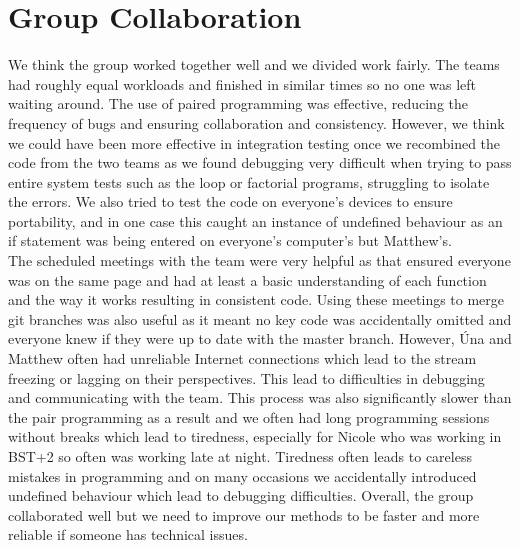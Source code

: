 \documentclass[11pt]{article}
\begin{document}
\section{Group Collaboration}
We think the group worked together well and we divided work fairly. The teams had roughly equal workloads and finished in similar times so no one was left waiting around. The use of paired programming was effective, reducing the frequency of bugs and ensuring collaboration and consistency. However, we think we could have been more effective in integration testing once we recombined the code from the two teams as we found debugging very difficult when trying to pass entire system tests such as the loop or factorial programs, struggling to isolate the errors. We also tried to test the code on everyone’s devices to ensure portability, and in one case this caught an instance of undefined behaviour as an if statement was being entered on everyone’s computer’s but Matthew’s.\\    
\newpage The scheduled meetings with the team were very helpful as that ensured everyone was on the same page and had at least a basic understanding of each function and the way it works resulting in consistent code. Using these meetings to merge git branches was also useful as it meant no key code was accidentally omitted and everyone knew if they were up to date with the master branch. However, \'Una and Matthew often had unreliable Internet connections which lead to the stream freezing or lagging on their perspectives. This lead to difficulties in debugging and communicating with the team. This process was also significantly slower than the pair programming as a result and we often had long programming sessions without breaks which lead to tiredness, especially for Nicole who was working in BST+2 so often was working late at night. Tiredness often leads to careless mistakes in programming and on many occasions we accidentally introduced undefined behaviour which lead to debugging difficulties. Overall, the group collaborated well but we need to improve our methods to be faster and more reliable if someone has technical issues. 
\end{document}
